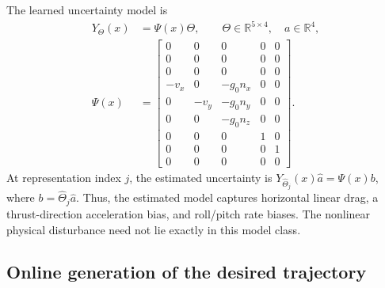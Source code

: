 \documentclass[11pt]{article}
\begin{document}
The learned uncertainty model is
\begin{align}
    Y_\Theta(x)&=\Psi(x)\Theta,\qquad
        \Theta\in\mathbb R^{5\times4},\quad a\in\mathbb R^4,
        \label{eq:quad-representation}\\
    \Psi(x)&=\begin{bmatrix}
        0&0&0&0&0\\
        0&0&0&0&0\\
        0&0&0&0&0\\
        -v_x&0&-g_0n_x&0&0\\
        0&-v_y&-g_0n_y&0&0\\
        0&0&-g_0n_z&0&0\\
        0&0&0&1&0\\
        0&0&0&0&1\\
        0&0&0&0&0
    \end{bmatrix}.
\end{align}
At representation index $j$, the estimated uncertainty is
$Y_{\hat\Theta_j}(x)\hat a=\Psi(x)b$, where $b=\hat\Theta_j\hat a$.
Thus, the estimated model captures horizontal linear drag, a
thrust-direction acceleration bias, and roll/pitch rate biases.
The nonlinear physical disturbance need not lie exactly in this model class.

\subsection{Online generation of the desired trajectory}
\end{document}
